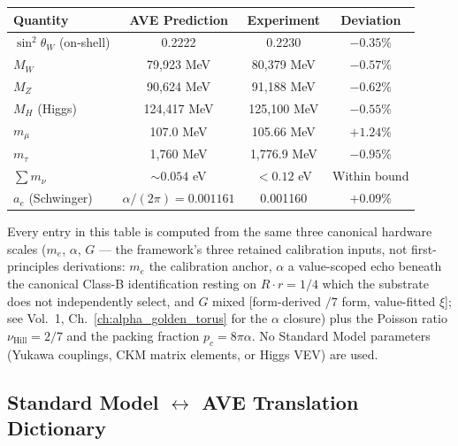 \begin{center}
\begin{tabular}{|l|c|c|c|}
\hline
Quantity & AVE Prediction & Experiment & Deviation \\ \hline
$\sin^2\theta_W$ (on-shell) & 0.2222 & 0.2230 & $-0.35\%$ \\
$M_W$ & 79,923 MeV & 80,379 MeV & $-0.57\%$ \\
$M_Z$ & 90,624 MeV & 91,188 MeV & $-0.62\%$ \\
$M_H$ (Higgs) & 124,417 MeV & 125,100 MeV & $-0.55\%$ \\
$m_\mu$ & 107.0 MeV & 105.66 MeV & $+1.24\%$ \\
$m_\tau$ & 1,760 MeV & 1,776.9 MeV & $-0.95\%$ \\
$\sum m_\nu$ & $\sim 0.054$ eV & $<0.12$ eV & Within bound \\
$a_e$ (Schwinger) & $\alpha/(2\pi) = 0.001161$ & 0.001160 & $+0.09\%$ \\ \hline
\end{tabular}
\end{center}

Every entry in this table is computed from the same three canonical hardware scales ($m_e$, $\alpha$, $G$ --- the framework's three retained calibration inputs, not first-principles derivations: $m_e$ the calibration anchor, $\alpha$ a value-scoped echo beneath the canonical Class-B identification resting on $R\cdot r = 1/4$ which the substrate does not independently select, and $G$ mixed [form-derived $/7$ form, value-fitted $\xi$]; see Vol.~1, Ch.~\ref{ch:alpha_golden_torus} for the $\alpha$ closure) plus the Poisson ratio $\nu_{\text{Hill}} = 2/7$ and the packing fraction $p_c = 8\pi\alpha$. No Standard Model parameters (Yukawa couplings, CKM matrix elements, or Higgs VEV) are used.

\subsection{Standard Model $\leftrightarrow$ AVE Translation Dictionary}
\label{sec:sm_ave_translation}

